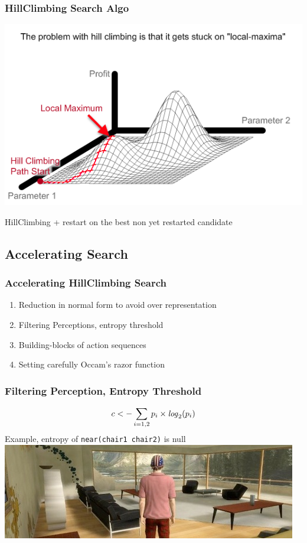 \documentclass{beamer}
\begin{document}
\frame
{
  \frametitle{HillClimbing Search Algo}

  \begin{center}
  \includegraphics[scale=0.3]{HillClimbingLocalMax.png}
  \end{center}

  HillClimbing + restart on the best non yet restarted candidate
}

\subsection{Accelerating Search}

\frame
{
  \frametitle{Accelerating HillClimbing Search}

  \begin{enumerate}
  \item<+-> Reduction in normal form to avoid over representation
  \item<+-> Filtering Perceptions, entropy threshold
  \item<+-> Building-blocks of action sequences
  \item<+-> Setting carefully Occam's razor function
  \end{enumerate}
}

\frame
{
  \frametitle{Filtering Perception, Entropy Threshold}
  \[c<-\sum_{i={1,2}} p_i \times {\it log}_2(p_i)\]
  Example, entropy of {\tt near(chair1 chair2)} is null
  \includegraphics[scale=0.35]{office_crop.jpg}
}
\end{document}
